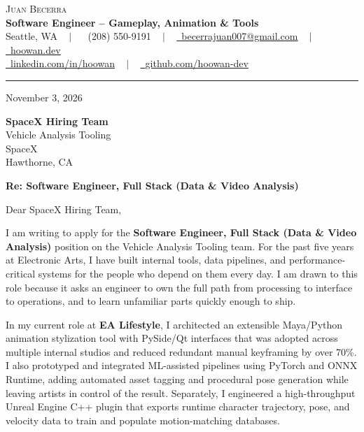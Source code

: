 \documentclass[letterpaper,11pt]{article}
\begin{document}
\begin{center}
    {\Huge \scshape Juan Becerra} \\ \vspace{4pt}
    \textbf{\large Software Engineer -- Gameplay, Animation \& Tools} \\ \vspace{4pt}
    \small Seattle, WA ~ $|$ ~
    \raisebox{-0.1\height}\faPhone\ (208) 550-9191 ~ $|$ ~
    \href{mailto:becerrajuan007@gmail.com}{\raisebox{-0.2\height}\faEnvelope\ \underline{becerrajuan007@gmail.com}} ~ $|$ ~
    \href{https://hoowan.dev}{\raisebox{-0.2\height}\faGlobe\ \underline{hoowan.dev}} \\ \vspace{2pt}
    \href{https://linkedin.com/in/hoowan/}{\raisebox{-0.2\height}\faLinkedin\ \underline{linkedin.com/in/hoowan}} ~ $|$ ~
    \href{https://github.com/hoowan-dev}{\raisebox{-0.2\height}\faGithub\ \underline{github.com/hoowan-dev}}
\end{center}

\vspace{4pt}
\hrule
\vspace{14pt}

\noindent November 3, 2026

\vspace{8pt}
\noindent \textbf{SpaceX Hiring Team} \\
Vehicle Analysis Tooling \\
SpaceX \\
Hawthorne, CA

\vspace{8pt}
\noindent \textbf{Re: Software Engineer, Full Stack (Data \& Video Analysis)}

\vspace{8pt}
\noindent Dear SpaceX Hiring Team,

I am writing to apply for the \textbf{Software Engineer, Full Stack (Data \& Video Analysis)} position on
the Vehicle Analysis Tooling team. For the past five years at Electronic Arts, I have built internal tools,
data pipelines, and performance-critical systems for the people who depend on them every day. I am drawn
to this role because it asks an engineer to own the full path from processing to interface to operations,
and to learn unfamiliar parts quickly enough to ship.

In my current role at \textbf{EA Lifestyle}, I architected an extensible Maya/Python animation stylization
tool with PySide/Qt interfaces that was adopted across multiple internal studios and reduced redundant
manual keyframing by over 70\%. I also prototyped and integrated ML-assisted pipelines using PyTorch and
ONNX Runtime, adding automated asset tagging and procedural pose generation while leaving artists in
control of the result. Separately, I engineered a high-throughput Unreal Engine C++ plugin that exports
runtime character trajectory, pose, and velocity data to train and populate motion-matching databases.
\end{document}
